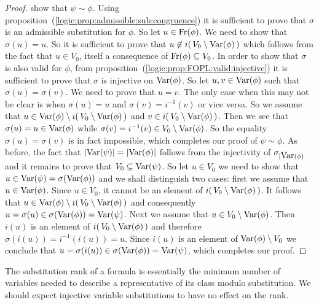\begin{proof}
show that $\psi\sim\phi$. Using
proposition~(\ref{logic:prop:admissible:sub:congruence}) it is
sufficient to prove that $\sigma$ is an admissible substitution for
$\phi$. So let $u\in\mbox{\rm Fr}(\phi)$. We need to show that
$\sigma(u)=u$. So it is sufficient to prove that $u\not\in
i(\,V_{0}\setminus\mbox{\rm Var}(\phi)\,)$ which follows from the fact that
$u\in V_{0}$, itself a consequence of $\mbox{\rm Fr}(\phi)\subseteq V_{0}$.
In order to show that $\sigma$ is also valid for $\phi$, from
proposition~(\ref{logic:prop:FOPL:valid:injective}) it is sufficient
to prove that $\sigma$ is injective on $\mbox{\rm Var}(\phi)$. So let
$u,v\in\mbox{\rm Var}(\phi)$ such that $\sigma(u)=\sigma(v)$. We need to prove
that $u=v$. The only case when this may not be clear is when
$\sigma(u)=u$ and $\sigma(v)=i^{-1}(v)$ or vice versa. So we assume
that $u\in\mbox{\rm Var}(\phi)\setminus i(\,V_{0}\setminus\mbox{\rm Var}(\phi)\,)$ and $
v\in i(\,V_{0}\setminus\mbox{\rm Var}(\phi)\,)$. Then we see that
$\sigma(u)=u\in\mbox{\rm Var}(\phi)$ while $\sigma(v)=i^{-1}(v)\in
V_{0}\setminus\mbox{\rm Var}(\phi)$. So the equality $\sigma(u)=\sigma(v)$ is
in fact impossible, which completes our proof of $\psi\sim\phi$. As
before, the fact that $|\mbox{\rm Var}(\psi)|=|\mbox{\rm Var}(\phi)|$ follows from the
injectivity of $\sigma_{|\mbox{\rm Var}(\phi)}$ and it remains to prove that
$V_{0}\subseteq\mbox{\rm Var}(\psi)$. So let $u\in V_{0}$ we need to show that
$u\in\mbox{\rm Var}(\psi)=\sigma(\mbox{\rm Var}(\phi))$ and we shall distinguish two
cases: first we assume that $u\in\mbox{\rm Var}(\phi)$. Since $u\in V_{0}$, it
cannot be an element of $i(\,V_{0}\setminus\mbox{\rm Var}(\phi)\,)$. It
follows that $u\in\mbox{\rm Var}(\phi)\setminus
i(\,V_{0}\setminus\mbox{\rm Var}(\phi)\,)$ and consequently
$u=\sigma(u)\in\sigma(\mbox{\rm Var}(\phi))=\mbox{\rm Var}(\psi)$. Next we assume that
$u\in V_{0}\setminus\mbox{\rm Var}(\phi)$. Then $i(u)$ is an element of
$i(\,V_{0}\setminus\mbox{\rm Var}(\phi)\,)$ and therefore
$\sigma(i(u))=i^{-1}(i(u))=u$. Since $i(u)$ is an element of
$\mbox{\rm Var}(\phi)\setminus V_{0}$ we conclude that
$u=\sigma(i(u))\in\sigma(\mbox{\rm Var}(\phi))=\mbox{\rm Var}(\psi)$, which completes
our proof.
\end{proof}

The substitution rank of a formula is essentially the minimum number
of variables needed to describe a representative of its class modulo
substitution. We should expect injective variable substitutions to
have no effect on the rank.

